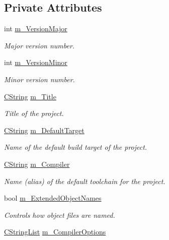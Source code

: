 \subsection*{Private Attributes}
\begin{DoxyCompactItemize}
\item 
int \hyperlink{classCCodeBlocksProject_ae7e3e490aaf03a97711cdbb02ec0a374}{m\-\_\-\-Version\-Major}
\begin{DoxyCompactList}\small\item\em Major version number. \end{DoxyCompactList}\item 
int \hyperlink{classCCodeBlocksProject_a619d9f24d56855a95bd5b04d76f9a5fe}{m\-\_\-\-Version\-Minor}
\begin{DoxyCompactList}\small\item\em Minor version number. \end{DoxyCompactList}\item 
\hyperlink{classCString}{C\-String} \hyperlink{classCCodeBlocksProject_ae0e87353b071ae8106b039e580e74db4}{m\-\_\-\-Title}
\begin{DoxyCompactList}\small\item\em Title of the project. \end{DoxyCompactList}\item 
\hyperlink{classCString}{C\-String} \hyperlink{classCCodeBlocksProject_abab92dc143ab33631209cdd4fde96535}{m\-\_\-\-Default\-Target}
\begin{DoxyCompactList}\small\item\em Name of the default build target of the project. \end{DoxyCompactList}\item 
\hyperlink{classCString}{C\-String} \hyperlink{classCCodeBlocksProject_a5a814ce2b3e1d40d77920b3c65873af0}{m\-\_\-\-Compiler}
\begin{DoxyCompactList}\small\item\em Name (alias) of the default toolchain for the project. \end{DoxyCompactList}\item 
bool \hyperlink{classCCodeBlocksProject_a7c318cc658b910db00e35e4b835a3246}{m\-\_\-\-Extended\-Object\-Names}
\begin{DoxyCompactList}\small\item\em Controls how object files are named. \end{DoxyCompactList}\item 
\hyperlink{classCStringList}{C\-String\-List} \hyperlink{classCCodeBlocksProject_a2ed56871685ed16b5bda3c4ce2b0f4c3}{m\-\_\-\-Compiler\-Options}

\end{DoxyCompactItemize}
